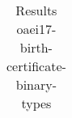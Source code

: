 \begin{table}[htb]
{\begin{tabular}[tb]{llllllllllllllllllllllllllllllllllllllll}
\end{tabular}

}

\caption{Results oaei17-birth-certificate-binary-types}

\label{tbl:results}

\end{table}